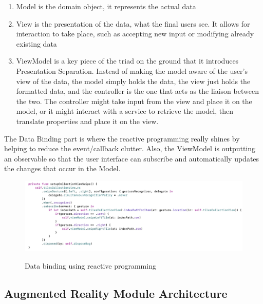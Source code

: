 \documentclass[12 pct]{report}
\begin{document}
\begin{enumerate}
\item Model is the domain object, it represents the actual data 
\item View is the presentation of the data, what the final users see. It allows for interaction to take place, such as accepting new input or modifying already existing data
\item ViewModel is a key piece of the triad on the ground that it introduces Presentation Separation.  Instead of making the model aware of the user’s view of the data, the model simply holds the data, the view just holds the formatted data, and the controller is the one that acts as the liaison between the two. The controller might take input from the view and place it on the model, or it might interact with a service to retrieve the model, then translate properties and place it on the view.
\end{enumerate}

The Data Binding part is where the reactive programming really shines by helping to reduce the event/callback clutter. Also, the ViewModel is outputting an observable so that the user interface can subscribe and automatically updates the changes that occur in the Model.


\begin{figure}[H]
\includegraphics[width=1.0\textwidth]{reactive-ui}
\centering
\label{fig:reactive-repository}
\caption{Data binding using reactive programming}
\end{figure}

\subsection*{Augmented Reality Module Architecture}
\end{document}
